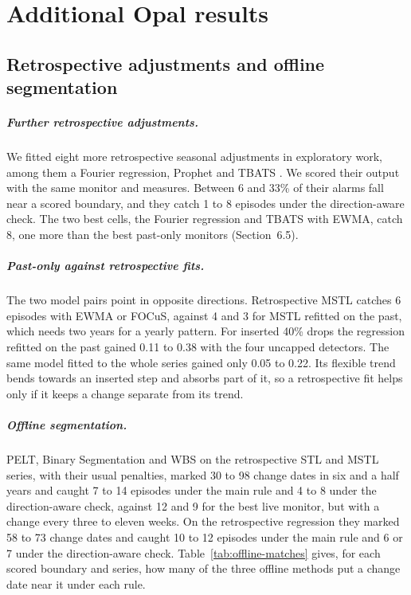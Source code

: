 \chapter{Additional Opal results}\label{app:opal}

\section{Retrospective adjustments and offline segmentation}\label{app:retro-extra}

\paragraph{Further retrospective adjustments.} We fitted eight more retrospective seasonal adjustments in exploratory work, among them a Fourier regression, Prophet \citep{taylor2018} and TBATS \citep{delivera2011}. We scored their output with the same monitor and measures. Between 6 and 33\% of their alarms fall near a scored boundary, and they catch 1 to 8 episodes under the direction-aware check. The two best cells, the Fourier regression and TBATS with EWMA, catch 8, one more than the best past-only monitors (Section~6.5).

\paragraph{Past-only against retrospective fits.} The two model pairs point in opposite directions. Retrospective MSTL catches 6 episodes with EWMA or FOCuS, against 4 and 3 for MSTL refitted on the past, which needs two years for a yearly pattern. For inserted 40\% drops the regression refitted on the past gained 0.11 to 0.38 with the four uncapped detectors. The same model fitted to the whole series gained only 0.05 to 0.22. Its flexible trend bends towards an inserted step and absorbs part of it, so a retrospective fit helps only if it keeps a change separate from its trend.

\paragraph{Offline segmentation.} PELT, Binary Segmentation and WBS on the retrospective STL and MSTL series, with their usual penalties, marked 30 to 98 change dates in six and a half years and caught 7 to 14 episodes under the main rule and 4 to 8 under the direction-aware check, against 12 and 9 for the best live monitor, but with a change every three to eleven weeks. On the retrospective regression they marked 58 to 73 change dates and caught 10 to 12 episodes under the main rule and 6 or 7 under the direction-aware check.
Table~\ref{tab:offline-matches} gives, for each scored boundary and series, how many of the three offline methods put a change date near it under each rule.

